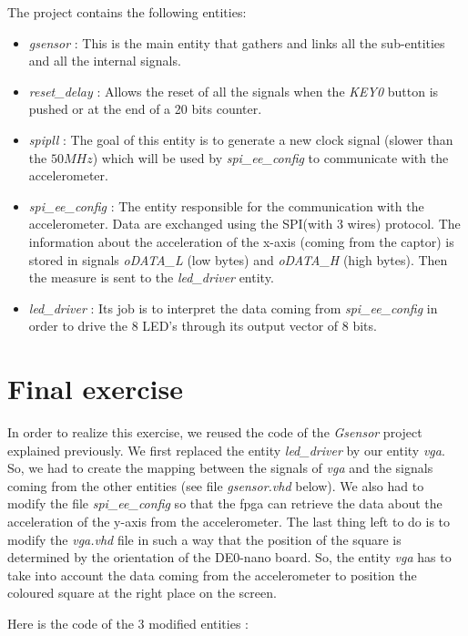\documentclass[12pt,a4paper,hyperlinks]{rapport_unif}
\begin{document}
The project contains the following entities:
\begin{itemize}
\item \textit{gsensor} : This is the main entity that gathers and links all the sub-entities and all the internal signals.
\item \textit{reset\_delay} : Allows the reset of all the signals when the \textit{KEY0} button is pushed or at the end of a 20 bits counter.
\item \textit{spipll} : The goal of this entity is to generate a new clock signal (slower than the $50MHz$) which will be used by \textit{spi\_ee\_config} to communicate with the accelerometer.
\item \textit{spi\_ee\_config} : The entity responsible for the communication with the accelerometer. Data are exchanged using the SPI(with 3 wires) protocol. The information about the acceleration of the x-axis (coming from the captor) is stored in signals \textit{oDATA\_L} (low bytes) and \textit{oDATA\_H} (high bytes). Then the measure is sent to the \textit{led\_driver} entity.
\item \textit{led\_driver} : Its job is to interpret the data coming from \textit{spi\_ee\_config} in order to drive the 8 LED's through its output vector of 8 bits.
\end{itemize}

\section{Final exercise}
In order to realize this exercise, we reused the code of the \textit{Gsensor} project explained previously. We first replaced the entity \textit{led\_driver} by our entity \textit{vga}. So, we had to create the mapping between the signals of \textit{vga} and the signals coming from the other entities (see file \textit{gsensor.vhd} below). We also had to modify the file \textit{spi\_ee\_config} so that the fpga can retrieve the data about the acceleration of the y-axis from the accelerometer. The last thing left to do is to modify the \textit{vga.vhd} file in such a way that the position of the square is determined by the orientation of the DE0-nano board. So, the entity \textit{vga} has to take into account the data coming from the accelerometer to position the coloured square at the right place on the screen.

Here is the code of the 3 modified entities :
\end{document}
